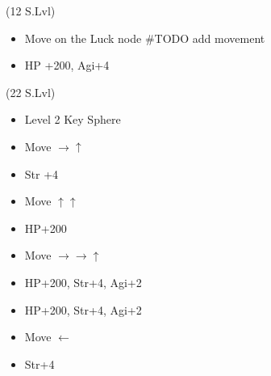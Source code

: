 \begin{spheregrid}
	\begin{itemize}
		\kimahrif (12 S.Lvl)
		\begin{itemize}
			\item Move on the Luck node \#TODO add movement
			\item HP +200, Agi+4
		\end{itemize}
		\tidusf (22 S.Lvl)
		\begin{itemize}
			\item Level 2 Key Sphere
			\item Move $\rightarrow\uparrow$
			\item Str +4
			\item Move $\uparrow\uparrow$
			\item HP+200
			\item Move $\rightarrow\rightarrow\uparrow$
			\item HP+200, Str+4, Agi+2
			\item HP+200, Str+4, Agi+2
			\item Move $\leftarrow$
			\item Str+4
		\end{itemize}
	\end{itemize}
\end{spheregrid}
